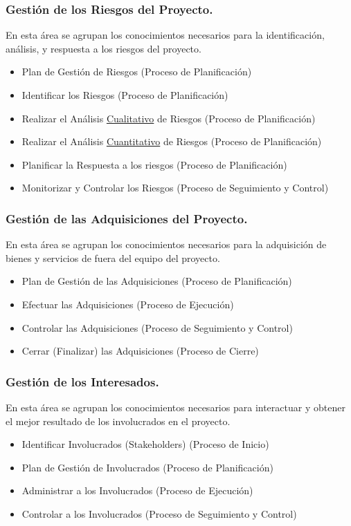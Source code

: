 \documentclass[12pt]{beamer}
\begin{document}
\begin{frame}
 \frametitle{Gestión de los Riesgos del Proyecto.}
 En esta área se agrupan los conocimientos necesarios para la identificación, análisis, y respuesta a los riesgos del proyecto.
 \begin{itemize}
  \item<2-> Plan de Gestión de Riesgos (Proceso de Planificación)
  \item<3-> Identificar los Riesgos (Proceso de Planificación)
  \item<4-> Realizar el Análisis \href{http://lema.rae.es/drae/srv/search?key=cualitativo}{Cualitativo} de Riesgos (Proceso de Planificación)
  \item<5-> Realizar el Análisis \href{http://lema.rae.es/drae/srv/search?key=cuantitativo}{Cuantitativo} de Riesgos (Proceso de Planificación)
  \item<6-> Planificar la Respuesta a los riesgos (Proceso de Planificación)
  \item<7-> Monitorizar y Controlar los Riesgos (Proceso de Seguimiento y Control)
 \end{itemize}
\end{frame}


\begin{frame}
 \frametitle{Gestión de las Adquisiciones del Proyecto.}
 En esta área se agrupan los conocimientos necesarios para la adquisición de bienes y servicios de fuera del equipo del proyecto.
 \begin{itemize}
  \item Plan de Gestión de las Adquisiciones (Proceso de Planificación)
  \item Efectuar las Adquisiciones (Proceso de Ejecución)
  \item Controlar las Adquisiciones (Proceso de Seguimiento y Control)
  \item Cerrar (Finalizar) las Adquisiciones (Proceso de Cierre)
 \end{itemize}
\end{frame}


\begin{frame}
 \frametitle{Gestión de los Interesados.}
 En esta área se agrupan los conocimientos necesarios para interactuar y obtener el mejor resultado de los involucrados en el proyecto.
 \begin{itemize}
  \item<2-> Identificar Involucrados (Stakeholders) (Proceso de Inicio)
  \item<3-> Plan de Gestión de Involucrados (Proceso de Planificación)
  \item<4-> Administrar a los Involucrados (Proceso de Ejecución)
  \item<5-> Controlar a los Involucrados (Proceso de Seguimiento y Control)
 \end{itemize}
\end{frame}
\end{document}

